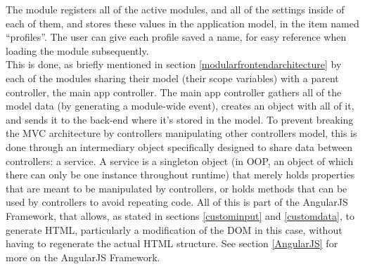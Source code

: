 The module registers all of the active modules, and all of the settings inside of each of them, and stores these values in 
the application model, in the item named ``profiles''. The user can give each profile saved a name, for easy reference when 
loading the module subsequently.\\

This is done, as briefly mentioned in section \ref{modularfrontendarchitecture} by each of the modules sharing their model 
(their scope variables) with a parent controller, the main app controller. The main app controller gathers all of the model 
data (by generating a module-wide event), creates an object with all of it, and sends it to the back-end where it's stored in 
the model. To prevent breaking the MVC architecture by controllers manipulating other controllers model, this is done through 
an intermediary object specifically designed to share data between controllers: a service. A service is a singleton object 
(in OOP, an object of which there can only be one instance throughout runtime) that merely holds properties that are meant to 
be manipulated by controllers, or holds methods that can be used by controllers to avoid repeating code. All of this is part 
of the AngularJS Framework, that allows, as stated in sections \ref{custominput} and \ref{customdata}, to generate HTML, 
particularly a modification of the DOM in this case, without having to regenerate the actual HTML structure. See section 
\ref{AngularJS} for more on the AngularJS Framework.